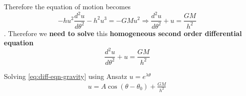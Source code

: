 Therefore the equation of motion becomes
$$-hu^{2}\frac{d^{2}u}{d\theta^{2}} - h^{2}u^{3} = -GMu^{2} \Rightarrow \frac{d^{2}u}{d\theta^{2}} + u = \frac{GM}{h^{2}}$$.
Therefore we {\bf need to solve} this {\bf homogeneous second order differential
		equation}
\begin{equation}
	\label{eq:diff-eqn-gravity}
	\frac{d^{2}u}{d\theta^{2}} + u = \frac{GM}{h^{2}}
\end{equation}
\clearpage

Solving \eqref{eq:diff-eqn-gravity} using Ansatz $u= e^{\lambda \theta}$
$$
\begin{aligned}
  u = A\cos(\theta - \theta_{0}) + \frac{GM}{h^{2}}
\end{aligned}
$$
